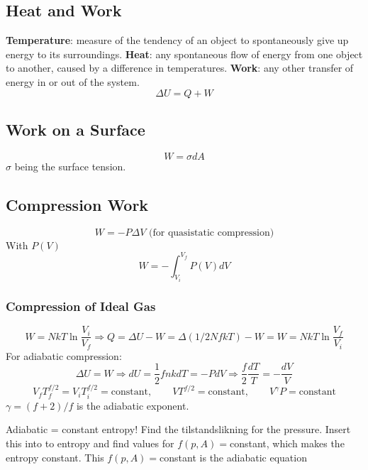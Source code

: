 \documentclass[a4paper,norsk, 10pt]{article}
\begin{document}
\subsection{Heat and Work}
\textbf{Temperature}: measure of the tendency of an object to spontaneously give up energy to its surroundings.
\textbf{Heat}: any spontaneous flow of energy from one object to another, caused by a difference in temperatures.
\textbf{Work}: any other transfer of energy in or out of the system.
\begin{equation}
\Delta U = Q + W
\end{equation}
\subsection{Work on a Surface}
\begin{equation}
W = \sigma dA
\end{equation}
$\sigma$ being the surface tension.
\subsection{Compression Work}
\begin{equation}
W = -P\Delta V \text{ (for quasistatic compression)}
\end{equation}
With $P(V)$
\begin{equation}
W = -\int_{V_i}^{V_f}P(V)dV
\end{equation}
\subsubsection{Compression of Ideal Gas}
\begin{equation}
W = NkT\ln\frac{V_i}{V_f} \Rightarrow Q = \Delta U - W = \Delta (1/2 NfkT) - W = W = NkT\ln\frac{V_f}{V_i}
\end{equation}
For adiabatic compression:
\begin{equation}
\Delta U = W \Rightarrow dU = \frac{1}{2}fnkdT = -PdV \Rightarrow \frac{f}{2}\frac{dT}{T} = -\frac{dV}{V}
\end{equation}
\begin{equation}
V_f T_f^{f/2} = V_i T_i^{f/2} = \text{constant}, \qquad VT^{f/2} = \text{constant},\qquad V^\gamma P = \text{constant}
\end{equation}
$\gamma = (f+2)/f$ is the adiabatic exponent. 

Adiabatic = constant entropy! Find the tilstandslikning for the pressure. Insert this into to entropy and find values for $f(p,A) = $constant, which makes the entropy constant. This $f(p,A) = $constant is the adiabatic equation
\end{document}

